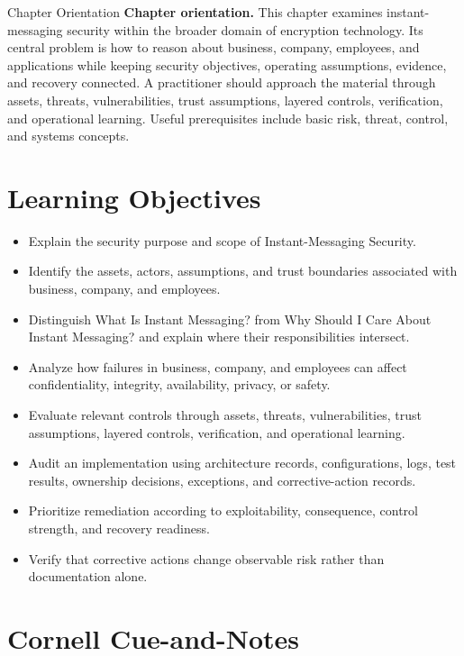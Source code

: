 \documentclass[11pt,letterpaper]{article}
\title{\CornellDocumentTitle}
\author{}
\date{}
\begin{document}
\maketitle
\begin{CornellOverviewBox}{Chapter Orientation}
\textbf{Chapter orientation.} This chapter examines instant-messaging security within the broader domain of encryption technology. Its central problem is how to reason about business, company, employees, and applications while keeping security objectives, operating assumptions, evidence, and recovery connected. A practitioner should approach the material through assets, threats, vulnerabilities, trust assumptions, layered controls, verification, and operational learning. Useful prerequisites include basic risk, threat, control, and systems concepts.
\end{CornellOverviewBox}
\section*{Learning Objectives}
\begin{itemize}
\item Explain the security purpose and scope of Instant-Messaging Security.
\item Identify the assets, actors, assumptions, and trust boundaries associated with business, company, and employees.
\item Distinguish What Is Instant Messaging? from Why Should I Care About Instant Messaging? and explain where their responsibilities intersect.
\item Analyze how failures in business, company, and employees can affect confidentiality, integrity, availability, privacy, or safety.
\item Evaluate relevant controls through assets, threats, vulnerabilities, trust assumptions, layered controls, verification, and operational learning.
\item Audit an implementation using architecture records, configurations, logs, test results, ownership decisions, exceptions, and corrective-action records.
\item Prioritize remediation according to exploitability, consequence, control strength, and recovery readiness.
\item Verify that corrective actions change observable risk rather than documentation alone.
\end{itemize}
\section*{Cornell Cue-and-Notes}
\end{document}
